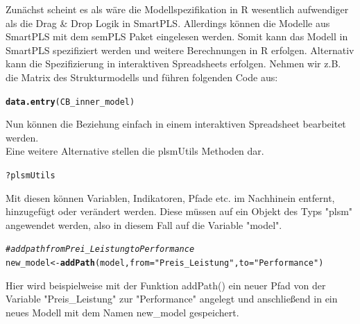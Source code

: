 \documentclass{article}\usepackage[]{graphicx}\usepackage[]{color}
\makeatletter
\newcommand{\hlstr}[1]{\textcolor[rgb]{0.192,0.494,0.8}{#1}}%
\newcommand{\hlcom}[1]{\textcolor[rgb]{0.678,0.584,0.686}{\textit{#1}}}%
\newcommand{\hlopt}[1]{\textcolor[rgb]{0,0,0}{#1}}%
\newcommand{\hlstd}[1]{\textcolor[rgb]{0.345,0.345,0.345}{#1}}%
\newcommand{\hlkwb}[1]{\textcolor[rgb]{0.69,0.353,0.396}{#1}}%
\newcommand{\hlkwc}[1]{\textcolor[rgb]{0.333,0.667,0.333}{#1}}%
\newcommand{\hlkwd}[1]{\textcolor[rgb]{0.737,0.353,0.396}{\textbf{#1}}}%
\newenvironment{kframe}{%
 \def\at@end@of@kframe{}%
 \ifinner\ifhmode%
  \def\at@end@of@kframe{\end{minipage}}%
  \begin{minipage}{\columnwidth}%
 \fi\fi%
 \def\FrameCommand##1{\hskip\@totalleftmargin \hskip-\fboxsep
 \colorbox{shadecolor}{##1}\hskip-\fboxsep
     \hskip-\linewidth \hskip-\@totalleftmargin \hskip\columnwidth}%
 \MakeFramed {\advance\hsize-\width
   \@totalleftmargin\z@ \linewidth\hsize
   \@setminipage}}%
 {\par\unskip\endMakeFramed%
 \at@end@of@kframe}
\newenvironment{knitrout}{}{} %
\makeatother
\begin{document}
Zunächst scheint es als wäre die Modellspezifikation in R wesentlich aufwendiger als die Drag \& Drop Logik in SmartPLS. Allerdings können die Modelle aus SmartPLS mit dem semPLS Paket eingelesen werden. Somit kann das Modell in SmartPLS spezifiziert werden und weitere Berechnungen in R erfolgen. Alternativ kann die Spezifizierung in interaktiven Spreadsheets erfolgen. Nehmen wir z.B. die Matrix des Strukturmodells und führen folgenden Code aus:
\begin{knitrout}
\color{fgcolor}\begin{kframe}
\begin{alltt}
\hlkwd{data.entry}\hlstd{(CB_inner_model)}
\end{alltt}
\end{kframe}
\end{knitrout}
Nun können die Beziehung einfach in einem interaktiven Spreadsheet bearbeitet werden.\\
Eine weitere Alternative stellen die plsmUtils Methoden dar.
\begin{knitrout}
\color{fgcolor}\begin{kframe}
\begin{alltt}
\hlopt{?}\hlstd{plsmUtils}
\end{alltt}
\end{kframe}
\end{knitrout}
Mit diesen können Variablen, Indikatoren, Pfade etc. im Nachhinein entfernt, hinzugefügt oder verändert werden. Diese müssen auf ein Objekt des Typs "plsm" angewendet werden, also in diesem Fall auf die Variable "model".
\begin{knitrout}
\color{fgcolor}\begin{kframe}
\begin{alltt}
\hlcom{#add path from Prei_Leistung to Performance}
\hlstd{new_model} \hlkwb{<-} \hlkwd{addPath}\hlstd{(model,} \hlkwc{from}\hlstd{=}\hlstr{"Preis_Leistung"}\hlstd{,} \hlkwc{to}\hlstd{=}\hlstr{"Performance"}\hlstd{)}
\end{alltt}
\end{kframe}
\end{knitrout}
Hier wird beispielweise mit der Funktion addPath() ein neuer Pfad von der Variable "Preis\_Leistung" zur "Performance" angelegt und anschließend in ein neues Modell mit dem Namen new_model gespeichert.
\end{document}
